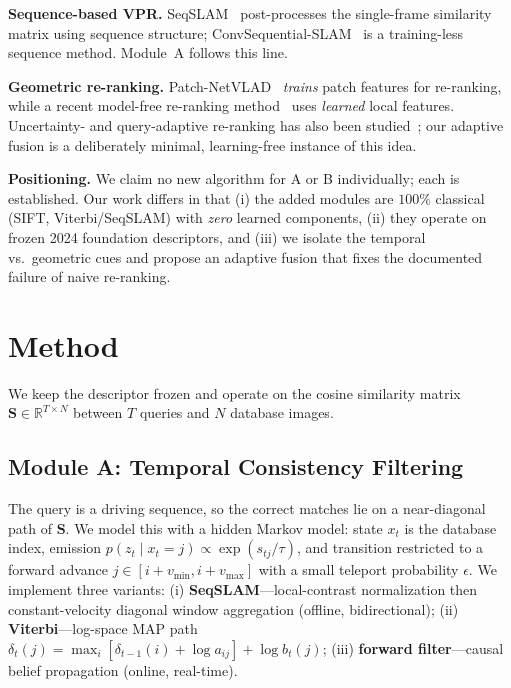 \documentclass[10pt,twocolumn,letterpaper]{article}
\begin{document}
\noindent\textbf{Sequence-based VPR.} SeqSLAM~\cite{milford2012seqslam}
post-processes the single-frame similarity matrix using sequence structure;
ConvSequential-SLAM~\cite{tomita2021convsequential} is a training-less
sequence method. Module~A follows this line.

\noindent\textbf{Geometric re-ranking.}
Patch-NetVLAD~\cite{hausler2021patchnetvlad} \emph{trains} patch features for
re-ranking, while a recent model-free re-ranking method~\cite{kanji2024modelfree}
uses \emph{learned} local features. Uncertainty- and query-adaptive re-ranking
has also been studied~\cite{zaffar2024uncertainty}; our adaptive fusion is a
deliberately minimal, learning-free instance of this idea.

\noindent\textbf{Positioning.} We claim no new algorithm for A or B
individually; each is established. Our work differs in that (i) the added
modules are $100\%$ classical (SIFT, Viterbi/SeqSLAM) with \emph{zero} learned
components, (ii) they operate on frozen 2024 foundation descriptors, and
(iii) we isolate the temporal vs.\ geometric cues and propose an adaptive
fusion that fixes the documented failure of naive re-ranking.

\section{Method}
\label{sec:method}
We keep the descriptor frozen and operate on the cosine similarity matrix
$\mathbf{S}\in\mathbb{R}^{T\times N}$ between $T$ queries and $N$ database
images.

\subsection{Module A: Temporal Consistency Filtering}
The query is a driving sequence, so the correct matches lie on a near-diagonal
path of $\mathbf{S}$. We model this with a hidden Markov model: state $x_t$ is
the database index, emission $p(z_t\mid x_t{=}j)\propto\exp(s_{tj}/\tau)$, and
transition restricted to a forward advance $j\in[i+v_{\min}, i+v_{\max}]$ with a
small teleport probability $\epsilon$. We implement three variants:
(i) \textbf{SeqSLAM}---local-contrast normalization then constant-velocity
diagonal window aggregation (offline, bidirectional);
(ii) \textbf{Viterbi}---log-space MAP path
$\delta_t(j)=\max_i[\delta_{t-1}(i)+\log a_{ij}]+\log b_t(j)$;
(iii) \textbf{forward filter}---causal belief propagation (online, real-time).
\end{document}
